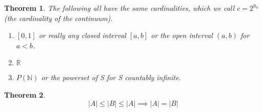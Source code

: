 \documentclass{article}
\newtheorem{theorem}{Theorem}[section]
\begin{document}
\begin{theorem}
    The following all have the same cardinalities, which we call $c = 2^{\aleph_0}$ (the cardinality of the continuum). 
    \begin{enumerate}
        \item $[0,1]$ or really any closed interval $[a,b]$ or the open interval $(a,b)$ for $a<b$. 
        \item $\mathbb{R}$
        \item $P(\mathbb{N})$ or the powerset of S for S countably infinite. 
    \end{enumerate} 
\end{theorem}

\begin{theorem}
    \begin{equation}
        |A| \leq |B| \leq |A| \implies |A| = |B|
    \end{equation}
\end{theorem}
\end{document}
